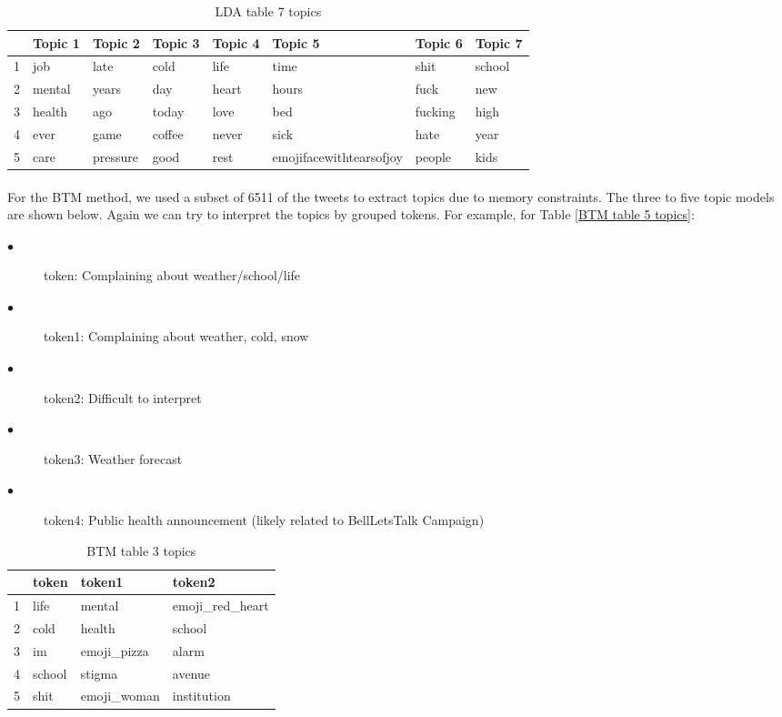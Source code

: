 \documentclass{article}
\begin{document}
\begin{table}[htb]
\caption{LDA table 7 topics}
\label{LDA table 7 topics}
\centering
\begin{tabular}{rlllllll}
  \hline
 & Topic 1 & Topic 2 & Topic 3 & Topic 4 & Topic 5 & Topic 6 & Topic 7 \\ 
  \hline
1 & job & late & cold & life & time & shit & school \\ 
  2 & mental & years & day & heart & hours & fuck & new \\ 
  3 & health & ago & today & love & bed & fucking & high \\ 
  4 & ever & game & coffee & never & sick & hate & year \\ 
  5 & care & pressure & good & rest & emojifacewithtearsofjoy & people & kids \\ 
   \hline
\end{tabular}
\end{table}

\FloatBarrier
\paragraph{}
For the BTM method, we used a subset of 6511 of the tweets to extract topics due to memory constraints.  The three to five topic models are shown below.  Again we can try to interpret the topics by grouped tokens.  For example, for Table \ref{BTM table 5 topics}:

\begin{description}
   \item[$\bullet$ ] token: Complaining about weather/school/life
   \item[$\bullet$ ] token1: Complaining about weather, cold, snow
   \item[$\bullet$ ] token2: Difficult to interpret
   \item[$\bullet$ ] token3: Weather forecast
   \item[$\bullet$ ] token4: Public health announcement (likely related to BellLetsTalk Campaign)
\end{description}


\begin{table}[ht]
\caption{BTM table 3 topics}
\label{BTM table 3 topics}
\centering
\begin{tabular}{rlll}
  \hline
 & token & token1 & token2 \\ 
  \hline
1 & life & mental & emoji\_red\_heart \\ 
  2 & cold & health & school \\ 
  3 & im & emoji\_pizza & alarm \\ 
  4 & school & stigma & avenue \\ 
  5 & shit & emoji\_woman & institution \\ 
   \hline
\end{tabular}
\end{table}
\end{document}
